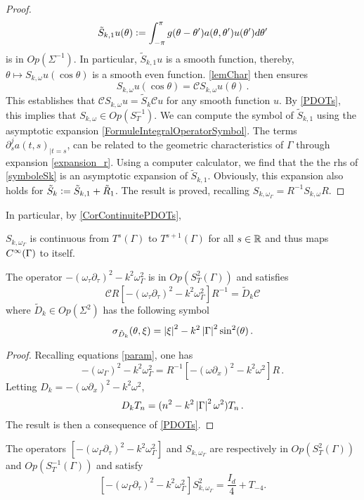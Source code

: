 \documentclass[a4paper]{article}
\begin{document}
\begin{proof}
	\[\tilde{S}_{k,1} u(\theta) \mathrel{\mathop:}= \int_{-\pi}^\pi g(\theta-\theta') a(\theta,\theta')u(\theta')d\theta'\]
	is in $\textit{Op}(\Sigma^{-1})$. In particular, $\tilde{S}_{k,1}u$ is a smooth function, thereby, $\theta \mapsto S_{k,\omega}u(\cos\theta)$ is a smooth even function. \autoref{lemChar} then ensures 
	\[S_{k,\omega}u(\cos\theta) = \mathcal{C} S_{k,\omega}u(\theta)\,.\] 
	This establishes that $\mathcal{C} S_{k,\omega}u = \tilde{S}_k \mathcal{C}u$ for any smooth function $u$. By \autoref{PDOTs}, this implies that $S_{k,\omega} \in \textit{Op}\left(S_T^{-1}\right)$. We can compute the symbol of $\tilde{S}_{k,1}$ using the asymptotic expansion \eqref{FormuleIntegralOperatorSymbol}. The terms $\partial_s^ja(t,s)_{|t=s}$, can be related to the geometric characteristics of $\Gamma$ through expansion \eqref{expansion_r}. Using a computer calculator, we find that the the rhs of \eqref{symboleSk} is an asymptotic expansion of $\tilde{S}_{k,1}$. Obviously, this expansion also holds for $\tilde{S}_k \mathrel{\mathop:}= \tilde{S}_{k,1} + \tilde{R}_1$. The result is proved, recalling $S_{k,\omega_\Gamma} = R^{-1}S_{k,\omega}R$.
\end{proof}
\noindent In particular, by \autoref{CorContinuitePDOTs},
\begin{Cor}
	$S_{k,\omega_\Gamma}$ is continuous from $T^s(\Gamma)$ to $T^{s+1}(\Gamma)$ for all $s\in \mathbb{R}$ and thus maps $C^{\infty}(\Gamma)$ to itself. 
\end{Cor}
\begin{Lem}
	\label{LemsymbolDk}
	The operator $-(\omega_\tau \partial_\tau)^2 - k^2 \omega_\Gamma^2$ is in $\textit{Op}(S_{T}^2(\Gamma))$ and satisfies 
	\[\mathcal{C}R\left[-(\omega_\tau \partial_\tau)^2 - k^2 \omega_\Gamma^2\right]R^{-1} = \tilde{D}_k\mathcal{C}\] 
	where $\tilde{D}_k \in \textit{Op}(\Sigma^2)$ has the following symbol
	\begin{equation}
		\sigma_{\tilde{D}_k}(\theta,\xi) = \left\lvert \xi \right\rvert^2 - k^2 \left\lvert \Gamma \right\rvert^2 \sin^2(\theta)\,.
		\label{symbolDk}
	\end{equation}
\end{Lem}
\begin{proof}
	Recalling equations \eqref{param}, one has 
	\[-(\omega_\Gamma)^2 - k^2 \omega_\Gamma^2 = R^{-1} \left[-(\omega \partial_x)^2 - k^2 \omega^2\right]R\,.\]
	Letting $D_k = -(\omega \partial_x)^2 - k^2 \omega^2$,
	\[D_k T_n = (n^2 - k^2\left\lvert \Gamma \right\rvert^2\omega^2)T_n\,.\]
	The result is then a consequence of \autoref{PDOTs}.
\end{proof}
\begin{The}
	\label{TheSkomega}
	The operators $\left[-(\omega_\Gamma \partial_\tau)^2 - k^2\omega_\Gamma^2\right]$ and  $S_{k,\omega_\Gamma}$ are respectively in $\textit{Op}(S^{2}_T(\Gamma))$ and $\textit{Op}(S^{-1}_T(\Gamma))$ and satisfy
	\[\left[-(\omega_\Gamma \partial_\tau)^2 - k^2\omega_\Gamma^2\right] S_{k,\omega_\Gamma}^2 = \frac{I_d}{4} + T_{-4}.\]
\end{The}
\end{document}
